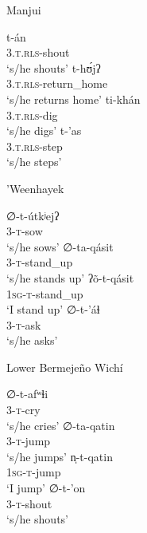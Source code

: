 \ea\label{ex:syllt:mj}
Manjui \citep{JC18}
    \begin{xlist}
        \ex \gll t-án\\
             3.\textsc{t.rls}-shout\\
             \glt `s/he shouts'
        \ex \gll t-hʊ́jʔ\\
             3.\textsc{t.rls}-return\_home\\
             \glt `s/he returns home'
        \ex \gll ti-khán\\
             3.\textsc{t.rls}-dig\\
             \glt `s/he digs'
        \ex \gll t-'as\\
             3.\textsc{t.rls}-step\\
             \glt `s/he steps'
    \end{xlist}
\z

\ea\label{ex:syllt:whk}
'Weenhayek \citep[375, 426, 431]{KC16}
    \begin{xlist}
        \ex \gll ∅-t-útkʲejʔ\\
             3-\textsc{t}-sow\\
             \glt `s/he sows'
        \ex \gll ∅-ta-qásit\\
             3-\textsc{t}-stand\_up\\
             \glt `s/he stands up'
        \ex \gll ʔõ-t-qásit\\
             1\textsc{sg-t}-stand\_up\\
             \glt `I stand up'
        \ex \gll ∅-t-’áɬ\\
             3-\textsc{t}-ask\\
             \glt `s/he asks'
    \end{xlist}
\z

\ea\label{ex:syllt:lbw}
Lower Bermejeño Wichí \citep[239--240]{VN14}
    \begin{xlist}
        \ex \gll ∅-t-afʷɬi\\
             3-\textsc{t}-cry\\
             \glt `s/he cries'
        \ex \gll ∅-ta-qatin\\
             3-\textsc{t}-jump\\
             \glt `s/he jumps'
        \ex \gll n̩-t-qatin\\
             1\textsc{sg-t}-jump\\
             \glt `I jump'
        \ex \gll ∅-t-’on\\
             3-\textsc{t}-shout\\
             \glt `s/he shouts'
    \end{xlist}
\z

